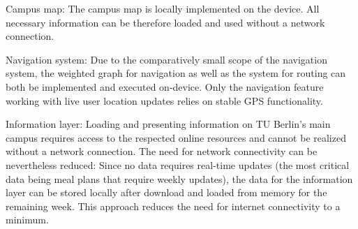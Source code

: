 Campus map: The campus map is locally implemented on the device. All necessary information can be therefore loaded and used without a network connection.

Navigation system: Due to the comparatively small scope of the navigation system, the weighted graph for navigation as well as the system for routing can both be implemented and executed on-device. Only the navigation feature working with live user location updates relies on stable GPS functionality.

Information layer: Loading and presenting information on TU Berlin's main campus requires access to the respected online resources and cannot be realized without a network connection. The need for network connectivity can be nevertheless reduced: Since no data requires real-time updates (the most critical data being meal plans that require weekly updates), the data for the information layer can be stored locally after download and loaded from memory for the remaining week. This approach reduces the need for internet connectivity to a minimum.


